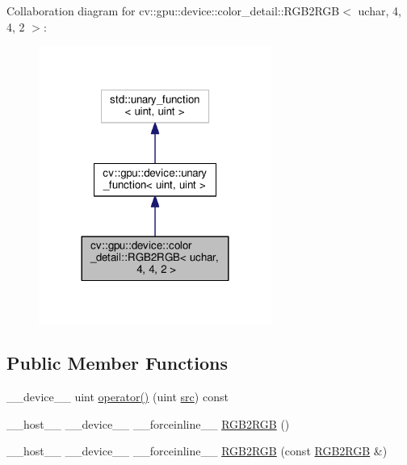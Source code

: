 Collaboration diagram for cv\-:\-:gpu\-:\-:device\-:\-:color\-\_\-detail\-:\-:R\-G\-B2\-R\-G\-B$<$ uchar, 4, 4, 2 $>$\-:\nopagebreak
\begin{figure}[H]
\begin{center}
\leavevmode
\includegraphics[width=216pt]{structcv_1_1gpu_1_1device_1_1color__detail_1_1RGB2RGB_3_01uchar_00_014_00_014_00_012_01_4__coll__graph}
\end{center}
\end{figure}
\subsection*{Public Member Functions}
\begin{DoxyCompactItemize}
\item 
\-\_\-\-\_\-device\-\_\-\-\_\- uint \hyperlink{structcv_1_1gpu_1_1device_1_1color__detail_1_1RGB2RGB_3_01uchar_00_014_00_014_00_012_01_4_a49a7d6d6498da1c470db814cc84fc23d}{operator()} (uint \hyperlink{legacy_8hpp_a371cd109b74033bc4366f584edd3dacc}{src}) const 
\item 
\-\_\-\-\_\-host\-\_\-\-\_\- \-\_\-\-\_\-device\-\_\-\-\_\- \-\_\-\-\_\-forceinline\-\_\-\-\_\- \hyperlink{structcv_1_1gpu_1_1device_1_1color__detail_1_1RGB2RGB_3_01uchar_00_014_00_014_00_012_01_4_afcddb7d4ba5f4b5092f453ecd0444350}{R\-G\-B2\-R\-G\-B} ()
\item 
\-\_\-\-\_\-host\-\_\-\-\_\- \-\_\-\-\_\-device\-\_\-\-\_\- \-\_\-\-\_\-forceinline\-\_\-\-\_\- \hyperlink{structcv_1_1gpu_1_1device_1_1color__detail_1_1RGB2RGB_3_01uchar_00_014_00_014_00_012_01_4_ac7f2a305274a1b242bf3abb11780d483}{R\-G\-B2\-R\-G\-B} (const \hyperlink{structcv_1_1gpu_1_1device_1_1color__detail_1_1RGB2RGB}{R\-G\-B2\-R\-G\-B} \&)
\end{DoxyCompactItemize}


